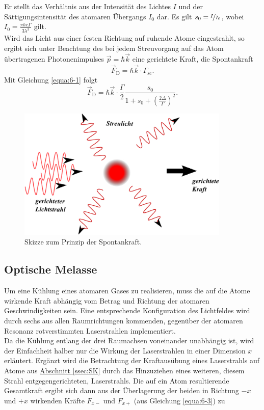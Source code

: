 \documentclass[
class=book,
accentcolor=1b,
custommargins=geometry,
fontsize=11pt,
thesis={type=Versuchsanleitung},
ruledheaders=all,
headline=false,
instbox=false,
marginpar=false,
title=small,
ignore-missing-data=true,
twoside=false,
logofile=apqdesign/tuda_logo.pdf,
pdfa=false %
]{apqpub}
\begin{document}
				Er stellt das Verhältnis aus der Intensität des Lichtes $I$ und der Sättigungsintensität des atomaren Übergangs $I_0$ dar. Es gilt $s_0 = \nicefrac{I}{I_0}$, wobei $I_0 = \frac{\pi hc\Gamma}{3\lambda^3}$ gilt.\\
				Wird das Licht aus einer festen Richtung auf ruhende Atome eingestrahlt, so ergibt sich unter Beachtung des bei jedem Streuvorgang auf das Atom übertragenen Photonenimpulses $\vec{p} = \hbar \vec{k}$ eine gerichtete Kraft, die Spontankraft	
				\begin{equation}
				\vec{F}_{\text{D}} = \hbar \vec{k} \cdot \Gamma_{\text{sc}}.
				\end{equation}
				Mit Gleichung \eqref{equa:6-1} folgt				
				\begin{equation}\label{equa:6-3}
				\vec{F}_{\text{D}} = \hbar \vec{k} \cdot \frac{\Gamma}{2} \frac{s_0}{1+s_0+\left(\frac{2\Delta}{\Gamma}\right)^2}.
				\end{equation}

				\begin{figure}[htb!]
					\centering
					\includegraphics[width=0.9\textwidth]{graphics/SK.jpg}
					\caption{Skizze zum Prinzip der Spontankraft.}
					\label{fig:SK}
				\end{figure}
				
				\subsection{Optische Melasse}				
				Um eine Kühlung eines atomaren Gases zu realisieren, muss die auf die Atome wirkende Kraft abhängig vom Betrag und Richtung der atomaren Geschwindigkeiten sein. Eine entsprechende Konfiguration des Lichtfeldes wird durch sechs aus allen Raumrichtungen kommenden, gegenüber der atomaren Resonanz rotverstimmten Laserstrahlen implementiert.\\
				Da die Kühlung entlang der drei Raumachsen voneinander unabhängig ist, wird der Einfachheit halber
				nur die Wirkung der Laserstrahlen in einer Dimension $x$ erläutert. 
				Ergänzt wird die Betrachtung der Kraftausübung eines Laserstrahls auf Atome aus \hyperref[ssec:SK]{Abschnitt \ref{ssec:SK}} durch das Hinzuziehen eines weiteren, diesem Strahl entgegengerichteten, Laserstrahls. 
				Die auf ein Atom resultierende Gesamtkraft ergibt sich dann aus der Überlagerung der beiden in Richtung $-x$ und $+x$ wirkenden Kräfte $F_{x-}$ und $F_{x+}$ (aus Gleichung \eqref{equa:6-3}) zu
				
\end{document}
